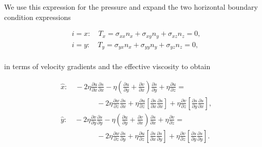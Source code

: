 
We use this expression for the pressure and expand the two horizontal boundary condition expressions

\begin{equation}
\begin{split}
 & i=x:\quad T_{x}=\sigma _{xx}n_{x}+\sigma _{xy}n_{y}+\sigma _{xz}n_{z}=0, \\ 
 & i=y:\quad T_{y}=\sigma _{yx}n_{x}+\sigma _{yy}n_{y}+\sigma _{yz}n_{z}=0, \\
\end{split}
 \end{equation}

\noindent
in terms of velocity gradients and the effective viscosity to obtain

\begin{equation}
\begin{split}
   {} & \hat{x}:\quad -2\eta \frac{\partial u}{\partial x}\frac{\partial s}{\partial x}-\eta \left( \frac{\partial u}{\partial y}+\frac{\partial v}{\partial x} \right)\frac{\partial s}{\partial y}+\eta \frac{\partial u}{\partial z}=  \\
   {} & \quad \quad \quad \quad \quad -2\eta \frac{\partial w}{\partial z}\frac{\partial s}{\partial x}+\eta \frac{\partial u}{\partial z}\left[ \frac{\partial s}{\partial x}\frac{\partial s}{\partial x} \right]+\eta \frac{\partial v}{\partial z}\left[ \frac{\partial s}{\partial y}\frac{\partial s}{\partial x} \right],  \\
%
   {} & \hat{y}:\quad -2\eta \frac{\partial v}{\partial y}\frac{\partial s}{\partial y}-\eta \left( \frac{\partial u}{\partial y}+\frac{\partial v}{\partial x} \right)\frac{\partial s}{\partial x}+\eta \frac{\partial v}{\partial z}=  \\
   {} & \quad \quad \quad \quad \quad -2\eta \frac{\partial w}{\partial z}\frac{\partial s}{\partial y}+\eta \frac{\partial u}{\partial z}\left[ \frac{\partial s}{\partial x}\frac{\partial s}{\partial y} \right]+\eta \frac{\partial v}{\partial z}\left[ \frac{\partial s}{\partial y}\frac{\partial s}{\partial y} \right].  \\
\end{split}
\end{equation}

